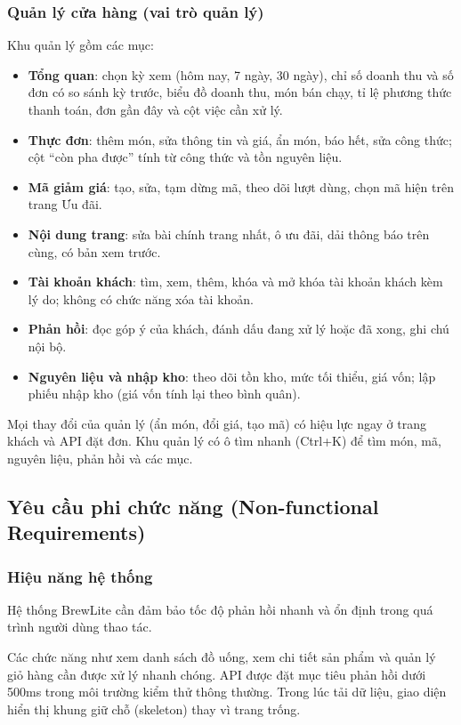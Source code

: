 \documentclass[12pt,a4paper]{article}
\begin{document}
\subsubsection{Quản lý cửa hàng (vai trò quản lý)}
Khu quản lý gồm các mục:
\begin{itemize}
  \item \textbf{Tổng quan}: chọn kỳ xem (hôm nay, 7 ngày, 30 ngày), chỉ số doanh thu và số đơn có so sánh kỳ trước, biểu đồ doanh thu, món bán chạy, tỉ lệ phương thức thanh toán, đơn gần đây và cột việc cần xử lý.
  \item \textbf{Thực đơn}: thêm món, sửa thông tin và giá, ẩn món, báo hết, sửa công thức; cột ``còn pha được'' tính từ công thức và tồn nguyên liệu.
  \item \textbf{Mã giảm giá}: tạo, sửa, tạm dừng mã, theo dõi lượt dùng, chọn mã hiện trên trang Ưu đãi.
  \item \textbf{Nội dung trang}: sửa bài chính trang nhất, ô ưu đãi, dải thông báo trên cùng, có bản xem trước.
  \item \textbf{Tài khoản khách}: tìm, xem, thêm, khóa và mở khóa tài khoản khách kèm lý do; không có chức năng xóa tài khoản.
  \item \textbf{Phản hồi}: đọc góp ý của khách, đánh dấu đang xử lý hoặc đã xong, ghi chú nội bộ.
  \item \textbf{Nguyên liệu và nhập kho}: theo dõi tồn kho, mức tối thiểu, giá vốn; lập phiếu nhập kho (giá vốn tính lại theo bình quân).
\end{itemize}

Mọi thay đổi của quản lý (ẩn món, đổi giá, tạo mã) có hiệu lực ngay ở trang khách và API đặt đơn. Khu quản lý có ô tìm nhanh (Ctrl+K) để tìm món, mã, nguyên liệu, phản hồi và các mục.

\newpage
\subsection{Yêu cầu phi chức năng (Non-functional Requirements)}

\subsubsection{Hiệu năng hệ thống}
Hệ thống BrewLite cần đảm bảo tốc độ phản hồi nhanh và ổn định trong quá trình người dùng thao tác.

Các chức năng như xem danh sách đồ uống, xem chi tiết sản phẩm và quản lý giỏ hàng cần được xử lý nhanh chóng. API được đặt mục tiêu phản hồi dưới 500ms trong môi trường kiểm thử thông thường. Trong lúc tải dữ liệu, giao diện hiển thị khung giữ chỗ (skeleton) thay vì trang trống.
\end{document}
